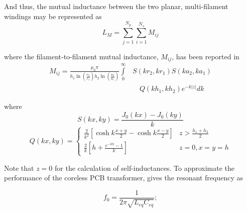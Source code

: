 \documentclass[conference]{IEEEtran}
\begin{document}
\hspace{-20pt} And thus, the mutual inductance between the two planar, multi-filament windings \cite{HurleyDuffy} may be represented as
%
\begin{equation}
	L_{M} = \sum\limits_{j=1}^{N_{p}}{\sum\limits_{i=1}^{N_{s}}{M_{ij}}}
\end{equation}

\hspace{-20pt} where the filament-to-filament mutual inductance, $ M_{ij} $, has been reported in \cite{HurleyDuffy}
\begin{equation}
\begin{split}
	M_{ij} = \frac{\mu_{0}\pi}{h_{1}\ln(\frac{r_{2}}{r_{1}})h_{2}\ln(\frac{a_{2}}{a_{1}})}\int\limits_{0}^{\infty} & S(kr_{2},kr_{1})S(ka_{2},ka_{1}) 
	\\ &\quad {Q(kh_{1},kh_{2})e^{-k|z|}dk}
\end{split}
\end{equation}

\hspace{-20pt} where
\begin{equation}
	S(kx, ky) = \frac{J_{0}(kx) - J_{0}(ky)}{k}
\end{equation}
%
\begin{equation}
	Q(kx, ky) = \left\{
		\begin{array}{lr}
		\frac{2}{k^{2}} \left[ \cosh{k\frac{x+y}{2}}-\cosh{k\frac{x-y}{2}} \right] & z>\frac{h_{1}+h_{2}}{2} \\
		\frac{2}{k} \left[ h+\frac{e^{-kh}-1}{k} \right] & z=0, x=y=h
		\end{array}
   \right.
\end{equation}

\hspace{-20pt} Note that $z = 0$ for the calculation of self-inductances. 
To approximate the performance of the coreless PCB transformer, \cite{TangHuiFundamental} gives the resonant frequency as

\begin{equation}
	f_{0} = \frac{1}{2\pi\sqrt{L_{eq}C_{eq}}};
\end{equation}
\end{document}
